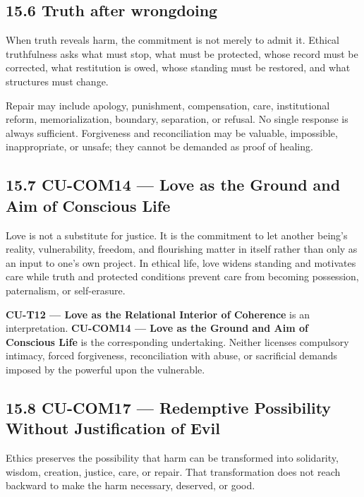 \documentclass[
  11pt,
]{article}
\begin{document}
\subsection{15.6 Truth after wrongdoing}\label{truth-after-wrongdoing}

When truth reveals harm, the commitment is not merely to admit it.
Ethical truthfulness asks what must stop, what must be protected, whose
record must be corrected, what restitution is owed, whose standing must
be restored, and what structures must change.

Repair may include apology, punishment, compensation, care,
institutional reform, memorialization, boundary, separation, or refusal.
No single response is always sufficient. Forgiveness and reconciliation
may be valuable, impossible, inappropriate, or unsafe; they cannot be
demanded as proof of healing.

\subsection{15.7 CU-COM14 --- Love as the Ground and Aim of Conscious
Life}\label{cu-com14-love-as-the-ground-and-aim-of-conscious-life}

Love is not a substitute for justice. It is the commitment to let
another being's reality, vulnerability, freedom, and flourishing matter
in itself rather than only as an input to one's own project. In ethical
life, love widens standing and motivates care while truth and protected
conditions prevent care from becoming possession, paternalism, or
self-erasure.

\textbf{CU-T12 --- Love as the Relational Interior of Coherence} is an
interpretation. \textbf{CU-COM14 --- Love as the Ground and Aim of
Conscious Life} is the corresponding undertaking. Neither licenses
compulsory intimacy, forced forgiveness, reconciliation with abuse, or
sacrificial demands imposed by the powerful upon the vulnerable.

\subsection{15.8 CU-COM17 --- Redemptive Possibility Without
Justification of
Evil}\label{cu-com17-redemptive-possibility-without-justification-of-evil}

Ethics preserves the possibility that harm can be transformed into
solidarity, wisdom, creation, justice, care, or repair. That
transformation does not reach backward to make the harm necessary,
deserved, or good.
\end{document}
